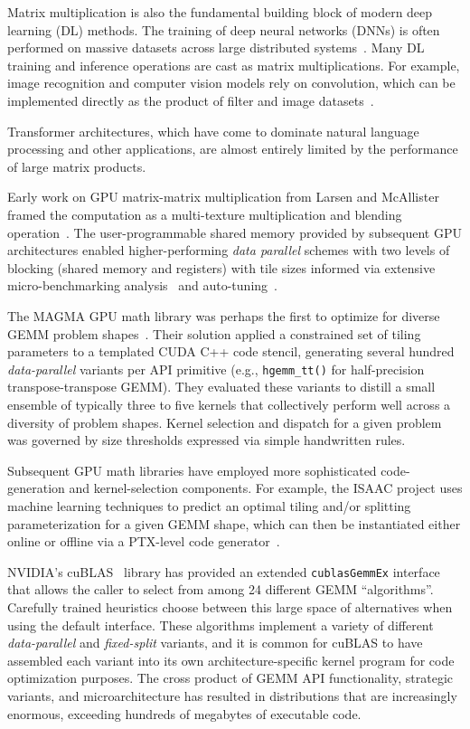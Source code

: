 Matrix multiplication is also the fundamental building block of modern deep learning (DL) methods. The training of deep neural networks (DNNs) is often performed on massive datasets across large distributed systems~\cite{Mattson:2020:MTB}. Many DL training and inference operations are cast as matrix multiplications. For example, image recognition and computer vision models rely on convolution, which can be implemented directly as the product of filter and image datasets~\cite{Chetlur:2014:CEP}. 

Transformer architectures, which have come to dominate natural language processing and other applications, are almost entirely limited by the performance of large matrix products.

Early work on GPU matrix-matrix multiplication from Larsen and McAllister framed the computation as a multi-texture multiplication and blending operation~\cite{Larsen:2001:FMM}. The user-programmable shared memory provided by subsequent GPU architectures enabled higher-performing \emph{data parallel} schemes with two levels of blocking (shared memory and registers) with tile sizes informed via extensive micro-benchmarking analysis~\cite{Barrachina:2008:EAT,Nath:2010:AIM,Tan:2011:FID,Tillet:2019:TAI} and auto-tuning~\cite{Cui:2010:ATD,Jiang:2005:ATM,Li:2009:ANA}.

The MAGMA GPU math library was perhaps the first to optimize for diverse GEMM problem shapes~\cite{Kurzak:2012:AGK}. Their solution applied a constrained set of tiling parameters to a templated CUDA C++ code stencil, generating several hundred \emph{data-parallel} variants per API primitive (e.g., \lstinline{hgemm_tt()} for half-precision transpose-transpose GEMM). They evaluated these variants to distill a small ensemble of typically three to five kernels that collectively perform well across a diversity of problem shapes. Kernel selection and dispatch for a given problem was governed by size thresholds expressed via simple handwritten rules.

Subsequent GPU math libraries have employed more sophisticated code-generation and kernel-selection components.  For example, the ISAAC project uses machine learning techniques to predict an optimal tiling and/or splitting parameterization for a given GEMM shape, which can then be instantiated either online or offline via a PTX-level code generator~\cite{Tillet:2017:IAA}.

NVIDIA's cuBLAS~\cite{NVIDIA:2020:CUBLAS} library has provided an extended 
\verb|cublasGemmEx| interface that allows the caller to select from among 24 different GEMM ``algorithms''. Carefully trained heuristics choose between this large space of alternatives when using the default interface.  These algorithms implement a variety of different \emph{data-parallel} and \emph{fixed-split} variants, and it is common for cuBLAS to have assembled each variant into its own architecture-specific kernel program for code optimization purposes.  The cross product of GEMM API functionality, strategic variants, and microarchitecture has resulted in distributions that are increasingly enormous, exceeding hundreds of megabytes of executable code.

